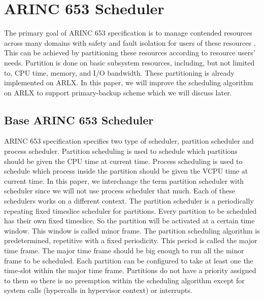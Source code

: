 \documentclass[conference]{IEEEtran}
\begin{document}




\section{ARINC 653 Scheduler}

The primary goal of ARINC 653 specification is to manage contended resources across many domains
with safety and fault isolation for users of these resources
\cite{AirlinesElectronicEngineeringCommittee2012}. This can be achieved by partitioning these
resources according to resource users' needs. Partition is done on basic subsystem resources,
including, but not limited to, CPU time, memory, and I/O bandwidth. These partitioning is
already implemented on ARLX. In this paper, we will improve the scheduling algorithm on ARLX to
support primary-backup scheme which we will discuss later.

\subsection{Base ARINC 653 Scheduler}

ARINC 653 specification specifies two type of scheduler, partition scheduler and process
scheduler. Partition scheduling is used to schedule which partitions should be given the CPU
time at current time. Process scheduling is used to schedule which process inside the partition
should be given the VCPU time at current time. In this paper, we interchange the term partition
scheduler with scheduler since we will not use process scheduler that much. Each of these
schedulers works on a different context. The partition scheduler is a periodically repeating
fixed timeslice scheduler for partitions. Every partition to be scheduled has their own fixed
timeslice. So the partition will be activated at a certain time window. This window is called
minor frame. The partition scheduling algorithm is predetermined, repetitive with a fixed
periodicity. This period is called the major time frame. The major time frame should be big
enough to run all the minor frame to be scheduled. Each partition can be configured to take at
least one the time-slot within the major time frame. Partitions do not have a priority assigned
to them so there is no preemption within the scheduling algorithm except for system calls
(hypercalls in hypervisor context) or interrupts.
\end{document}
